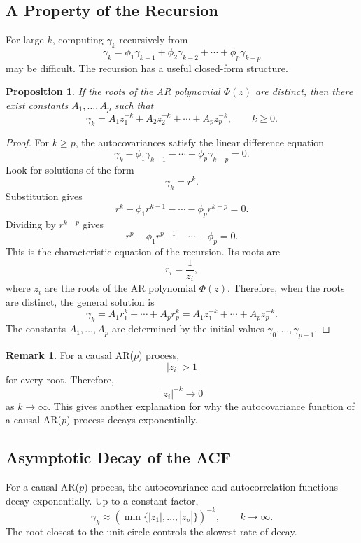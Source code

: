 \documentclass[12pt,oneside]{book}
\numberwithin{equation}{section}
\theoremstyle{definition}
\newtheorem{remark}{Remark}[section]
\theoremstyle{plain}
\newtheorem{proposition}{Proposition}[section]
\theoremstyle{remark}
\begin{document}
\subsection{A Property of the Recursion}

For large $k$, computing $\gamma_k$ recursively from
\[
\gamma_k
=
\phi_1\gamma_{k-1}
+
\phi_2\gamma_{k-2}
+\cdots+
\phi_p\gamma_{k-p}
\]
may be difficult. The recursion has a useful closed-form structure.

\begin{proposition}
If the roots of the AR polynomial $\Phi(z)$ are distinct, then there exist constants $A_1,\ldots,A_p$ such that
\[
\gamma_k
=
A_1z_1^{-k}+A_2z_2^{-k}+\cdots+A_pz_p^{-k},
\qquad k\geq 0.
\]
\end{proposition}

\begin{proof}
For $k\geq p$, the autocovariances satisfy the linear difference equation
\[
\gamma_k
-
\phi_1\gamma_{k-1}
-\cdots
-
\phi_p\gamma_{k-p}
=
0.
\]
Look for solutions of the form
\[
\gamma_k=r^k.
\]
Substitution gives
\[
r^k-\phi_1r^{k-1}-\cdots-\phi_pr^{k-p}=0.
\]
Dividing by $r^{k-p}$ gives
\[
r^p-\phi_1r^{p-1}-\cdots-\phi_p=0.
\]
This is the characteristic equation of the recursion. Its roots are
\[
r_i=\frac{1}{z_i},
\]
where $z_i$ are the roots of the AR polynomial $\Phi(z)$. Therefore, when the roots are distinct, the general solution is
\[
\gamma_k
=
A_1r_1^k+\cdots+A_pr_p^k
=
A_1z_1^{-k}+\cdots+A_pz_p^{-k}.
\]
The constants $A_1,\ldots,A_p$ are determined by the initial values $\gamma_0,\ldots,\gamma_{p-1}$.
\end{proof}

\begin{remark}
For a causal AR($p$) process,
\[
|z_i|>1
\]
for every root. Therefore,
\[
|z_i|^{-k}\to 0
\]
as $k\to\infty$. This gives another explanation for why the autocovariance function of a causal AR($p$) process decays exponentially.
\end{remark}

\subsection{Asymptotic Decay of the ACF}

For a causal AR($p$) process, the autocovariance and autocorrelation functions decay exponentially. Up to a constant factor,
\[
\gamma_k
\approx
\left(\min\{|z_1|,\ldots,|z_p|\}\right)^{-k},
\qquad k\to\infty.
\]
The root closest to the unit circle controls the slowest rate of decay.
\end{document}
